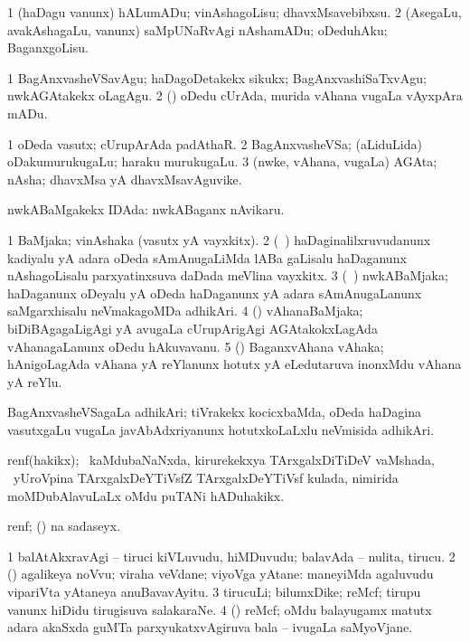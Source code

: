 \bentry
{} 
\gl{\sakirx}
\expl{}
\bmng
\bnum
\num{1} (haDagu \mo vanunx) hALumADu; vinAshagoLisu; dhavxMsavebibxsu. 
\num{2} (AsegaLu, avakAshagaLu, \mo vanunx) saMpUNaRvAgi nAshamADu; oDeduhAku; BaganxgoLisu. 
\enum
\emng

\noindent
\gl{\akirx}
\expl{}
\bmng
\bnum
\num{1} BagAnxvasheVSavAgu; haDagoDetakekx sikukx; BagAnxvashiSaTxvAgu; nwkAGAtakekx oLagAgu. 
\num{2} (\ame) oDedu cUrAda, murida vAhana \mo vugaLa vAyxpAra mADu. 
\enum
\emng
\eentry

\bentry
{} 
\gl{\nA}
\expl{}
\bmng
\bnum
\num{1} oDeda vasutx; cUrupArAda padAthaR. 
\num{2} BagAnxvasheVSa; (aLiduLida) oDakumurukugaLu; haraku murukugaLu. 
\num{3} (nwke, vAhana, \mo vugaLa) AGAta; nAsha; dhavxMsa yA dhavxMsavAguvike. 
\enum
\emng
\eentry

\bentry
{} 
\gl{\gu}
\expl{}
\bmng
nwkABaMgakekx IDAda:  nwkABaganx nAvikaru. 
\emng
\eentry

\bentry
{} 
\gl{\nA}
\expl{}
\bmng
\bnum
\num{1} BaMjaka; vinAshaka (vasutx yA vayxkitx). 
\num{2} (\kanmu\ \ca) haDaginalilxruvudanunx kadiyalu yA adara oDeda sAmAnugaLiMda lABa gaLisalu haDaganunx nAshagoLisalu parxyatinxsuva daDada meVlina vayxkitx. 
\num{3} (\kanmu\ \ame) nwkABaMjaka; haDaganunx oDeyalu yA oDeda haDaganunx yA adara sAmAnugaLanunx saMgarxhisalu neVmakagoMDa adhikAri. 
\num{4} (\ame) vAhanaBaMjaka; biDiBAgagaLigAgi yA avugaLa cUrupArigAgi AGAtakokxLagAda vAhanagaLanunx oDedu hAkuvavanu. 
\num{5} (\ame) BaganxvAhana vAhaka; hAnigoLagAda vAhana yA reYlanunx hotutx yA eLedutaruva inonxMdu vAhana yA reYlu. 
\enum
\emng
\eentry

\bentry
{} 
\gl{\nA}
\expl{}
\bmng
BagAnxvasheVSagaLa adhikAri; tiVrakekx kocicxbaMda, oDeda haDagina vasutxgaLu \mo vugaLa javAbAdxriyanunx hotutxkoLaLxlu neVmisida adhikAri. 
\emng
\eentry

\bentry 
{} 
\gl{\nA}
\expl{}
\bmng
renf(hakikx); \sA\ kaMdubaNaNxda, kirurekekxya TArxgalxDiTiDeV vaMshada, \kanmu\ yUroVpina TArxgalxDeYTiVsfZ TArxgalxDeYTiVsf kulada, nimirida moMDubAlavuLaLx oMdu puTANi hADuhakikx. 
\emng
\eentry

\bentry 
{} 
\gl{\nA}
\expl{}
\bmng
renf; (\UK)  na sadaseyx. 
\emng
\eentry

\bentry
{} 
\gl{\nA}
\expl{}
\bmng
\bnum
\num{1} balAtAkxravAgi -- tiruci kiVLuvudu, hiMDuvudu; balavAda -- nulita, tirucu. 
\num{2} (\rUpa) agalikeya noVvu; viraha veVdane; viyoVga yAtane:  maneyiMda agaluvudu vipariVta yAtaneya anuBavavAyitu. 
\num{3} tirucuLi; bilumxDike; reMcf; tirupu \mo vanunx hiDidu tirugisuva salakaraNe. 
\num{4} (\Bwvi) reMcf; oMdu balayugamx  matutx adara akaSxda guMTa parxyukatxvAgiruva bala -- ivugaLa saMyoVjane. 
\enum
\emng
\eentry

